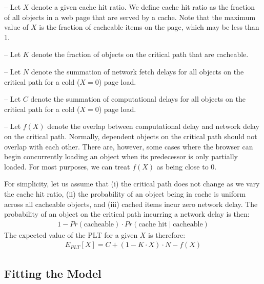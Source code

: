 \noindent-- Let $X$ denote a given cache hit ratio. We define cache hit ratio as the fraction
of all objects in a web page that are served by a cache. Note that the maximum
value of $X$ is the fraction of cacheable items on the page, which may be less than 1.

\noindent-- Let $K$ denote the fraction of objects on the critical path that
are cacheable.

\noindent-- Let $N$ denote the summation of network fetch delays for all objects on the
critical path for a cold ($X=0$) page load.

\noindent-- Let $C$ denote the summation of computational delays for all
objects on the critical path for a cold ($X=0$) page load.

\noindent-- Let $f(X)$ denote the overlap between computational delay and
network delay on the critical path. Normally, dependent objects on the
critical path should not overlap with each other. There are, however, some cases where the browser can begin concurrently loading an object
when its predecessor is only partially loaded.
For most purposes, we can treat $f(X)$
as being close to 0.

For simplicity, let us assume that (i) the critical path does not change as we vary the cache hit
ratio, (ii) the probability of an object being in cache is uniform
across all cacheable objects, and (iii) cached items incur zero network delay. The probability of an object
on the critical path incurring a network delay is then:
\begin{align*}
1 - Pr(\text{cacheable}) \cdot Pr(\text{cache hit}\;|\;\text{cacheable})
\end{align*}
The expected value of the PLT for a given $X$ is therefore:
\begin{align*}
E_{PLT}[X] = C + (1 - K \cdot X) \cdot N - f(X)
\end{align*}

\subsection{Fitting the Model}
\label{subsec:model_fitting}

